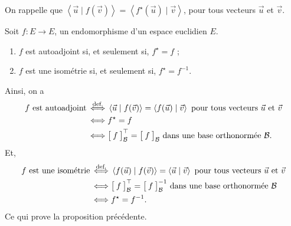 On rappelle que $\left<\vec{u} \mid f(\vec{v}) \right> = \left<f^\star(\vec{u}) \mid \vec{v} \right>$, pour tous vecteurs $\vec{u}$\/ et $\vec{v}$.

\begin{prop}
	Soit $f : E \to E$, un endomorphisme d'un espace euclidien $E$.
	\begin{enumerate}
		\item $f$\/ est autoadjoint si, et seulement si, $f^\star = f$\/ ;
		\item $f$\/ est une isométrie si, et seulement si, $f^\star = f^{-1}$.
	\end{enumerate}
\end{prop}

Ainsi, on a
\begin{align*}
	f \text{ est autoadjoint} \mathop{\iff}^{\text{def.}}& \left<\vec{u}  \mid f(\vec{v}) \right> = \left<f(\vec{u})  \mid  \vec{v} \right> \text{ pour tous vecteurs } \vec{u} \text{ et } \vec{v} \\
	\iff& f^\star = f \\
	\iff& \big[\:f\:\big]_\mathcal{B}^\top = \big[\:f\:\big]_\mathcal{B} \text{ dans une base orthonormée } \mathcal{B}. \\
\end{align*}
Et,
\begin{align*}
	f \text{ est une isométrie} \mathop{\iff}^{\text{def.}}& \left< f(\vec{u}) \mid f(\vec{v}) \right> = \left<\vec{u}  \mid \vec{v}  \right> \text{ pour tous vecteurs } \vec{u} \text{ et } \vec{v}\\
	\iff& \big[\:f\:\big]_\mathcal{B}^\top = \big[\:f\:\big]_\mathcal{B}^{-1} \text{ dans une base orthonormée } \mathcal{B} \\
	\iff&  f^\star  = f^{-1}. \\
\end{align*}
Ce qui prove la proposition précédente.

